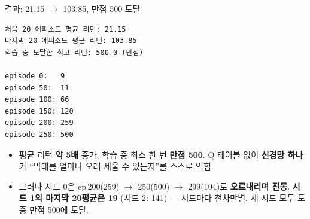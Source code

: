 \documentclass[aspectratio=169,11pt]{beamer}
\begin{document}

\begin{frame}[fragile]{결과: 21.15 $\to$ 103.85, 만점 500 도달}
  \small
  \begin{verbatim}
처음 20 에피소드 평균 리턴: 21.15
마지막 20 에피소드 평균 리턴: 103.85
학습 중 도달한 최고 리턴: 500.0 (만점)

episode 0:   9
episode 50:  11
episode 100: 66
episode 150: 120
episode 200: 259
episode 250: 500
  \end{verbatim}
  \begin{itemize}
    \item 평균 리턴 약 \textbf{5배} 증가, 학습 중 최소 한 번 \textbf{만점 500}.
      Q-테이블 없이 \textbf{신경망 하나}가 ``막대를 얼마나 오래 세울 수
      있는지''를 스스로 익힘.
    \item 그러나 시드 0은 ep\,200(259) $\to$ 250(500) $\to$ 299(104)로
      \textbf{오르내리며 진동}. \textbf{시드 1의 마지막 20평균은 19}
      (시드 2: 141) --- 시드마다 천차만별. 세 시드 모두 도중 만점 500에
      도달.
  \end{itemize}
  \normalsize
\end{frame}
\end{document}
